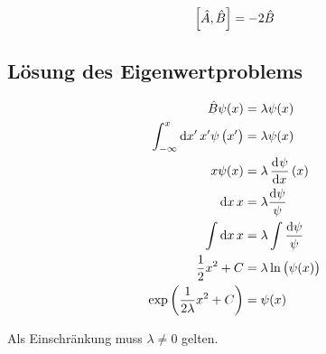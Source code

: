 \[
	\sbr{\hat A, \hat B}
	=
	- 2 \hat B
\]


\subsection{Lösung des Eigenwertproblems}

\begin{align*}
	\hat B \psi(x) &= \lambda \psi(x) \\
	\int_{-\infty}^x \dif{x'} \, x' \psi\del{x'} &= \lambda \psi(x) \\
	x \psi(x) &= \lambda \dod\psi x(x) \\
	\dif x \, x &= \lambda \frac{\dif \psi}{\psi} \\
	\int \dif x \, x &= \lambda \int \frac{\dif \psi}{\psi} \\
	\half x^2 + C &= \lambda \ln\del{\psi(x)} \\
	\exp\del{\frac{1}{2\lambda} x^2 + C} &= \psi(x)
\end{align*}

Als Einschränkung muss $\lambda \neq 0$ gelten.


\IfFileExists{\bibliographyfile}{
	
}{}



